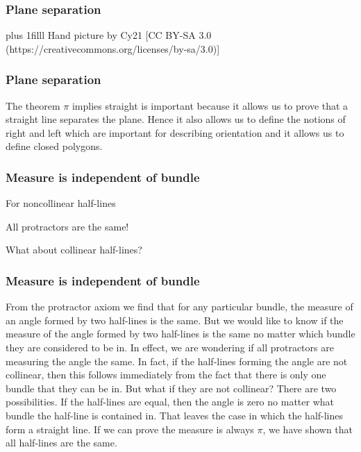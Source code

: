 \documentclass{beamer}
\newcommand{\btVFill}{\vskip0pt plus 1filll}
\begin{document}
{{\graphicspath{{/Users/Imogen/Desktop/Birkhoff_Presentation/}}
\begin{frame}
\frametitle{Plane separation}
 
 
 
 \btVFill
 {\footnotesize Hand picture by Cy21 [CC BY-SA 3.0  (https://creativecommons.org/licenses/by-sa/3.0)]}
\end{frame}}

\begin{frame}
\frametitle{Plane separation}
The theorem $\pi$ implies straight is important because it allows us to prove that a straight line separates the plane. Hence it also allows us to define the notions of right and left which are important for describing orientation and it allows us to define closed polygons.
\end{frame}

\begin{frame}
\frametitle{Measure is independent of bundle}
For noncollinear half-lines

\medskip

\begin{center} \Huge
 All protractors are the same!
\end{center}

\bigskip

What about collinear half-lines?
\end{frame}

\begin{frame}
\frametitle{Measure is independent of bundle}
From the protractor axiom we find that for any particular bundle, the measure of an angle formed by two half-lines is the same. But we would like to know if the measure of the angle formed by two half-lines is the same no matter which bundle they are considered to be in. In effect, we are wondering if all protractors are measuring the angle the same. In fact, if the half-lines forming the angle are not collinear, then this follows immediately from the fact that there is only one bundle that they can be in. But what if they are not collinear? There are two possibilities. If the half-lines are equal, then the angle is zero no matter what bundle the half-line is contained in. That leaves the case in which the half-lines form a straight line. If we can prove the measure is always $\pi$, we have shown that all half-lines are the same.



\end{frame}}
\end{document}
